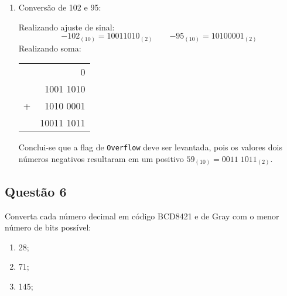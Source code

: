 \documentclass{article}
\begin{document}
\begin{resolution}
\begin{enumerate}
                    \item Conversão de 102 e 95:
                        \begin{figure}[H]
                            \centering
                        \end{figure}
                    Realizando ajuste de sinal:
                        \begin{equation*}
                            \boxed{-102_{(10)} = 10011010_{(2)}}
                            \qquad
                            \boxed{ -95_{(10)} = 10100001_{(2)}}
                        \end{equation*}
                    Realizando soma:
                        \begin{table}[H]
                            \centering  
                            \begin{tabular}[]{cr}
                                  &         0\\
                                  & 1001 1010\\
                                + & 1010 0001\\\hline
                                  &10011 1011\\
                            \end{tabular}
                        \end{table}
                    Conclui-se que a flag de \texttt{Overflow} deve ser levantada, pois os valores dois números negativos resultaram em um positivo $\boxed{59_{(10)} = 0011\;1011_{(2)}}$.
                \end{enumerate}
            \end{resolution}
\newpage

        \subsection{Questão 6}
            \begin{exercise}
                Converta cada número decimal em código BCD8421 e de Gray com o menor número de bits possível:
                    \begin{enumerate}[noitemsep]
                        \item 28;
                        \item 71;
                        \item 145;
                    \end{enumerate}
            \end{exercise}
            \begin{resolution}

            \end{resolution}
\newpage
\end{document}
